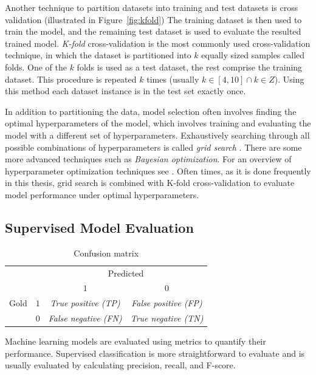 Another technique to partition datasets into training and test datasets
is cross validation \citep{arlot2010survey} (illustrated in Figure~\ref{fig:kfold})
The training dataset is then used to train the model, and the remaining
test dataset is used to evaluate the resulted trained model. 
\textit{K-fold} cross-validation is the most commonly used
cross-validation technique, in which the dataset is partitioned into 
$k$ equally sized samples called folds. One of the $k$ folds is
used as a test dataset, the rest comprise the training dataset. This
procedure is repeated $k$ times (usually $k \in [4, 10] \cap k \in Z$).
Using this method each dataset instance is in the test set 
exactly once.

In addition to partitioning the data, model selection often involves finding
the optimal hyperparameters of the model, which involves  training and
evaluating the model with a different set of hyperparameters.  Exhaustively
searching through all possible combinations of hyperparameters is called
\textit{grid search} \citep{bergstra2012random}. There are some more advanced
techniques such as \textit{Bayesian optimization}.  For an overview of
hyperparameter optimization techniques see \citep{snoek2012practical}.
Often times, as it is done frequently in this thesis, grid search is combined 
with K-fold cross-validation to evaluate model performance under optimal
hyperparameters. 

\subsection{Supervised Model Evaluation}
\label{sec:metrics}

\begin{table}[t]
	\centering
	\begin{tabular}{c c|c c}
	\toprule
	& & \multicolumn{2}{c}{Predicted} \\
	\multirow{4}{*}{Gold} & & $1$ & $0$ \\ \hline
	& $1$ & \textit{True positive (TP)} & \textit{False positive (FP)} \\
		& $0$ & \textit{False negative (FN)} & \textit{True negative (TN)} \\
	\bottomrule
\end{tabular}
	\caption{Confusion matrix}
	\label{tab:conf_mat}
\end{table}

Machine learning models are evaluated using metrics to quantify their
performance. Supervised classification is more straightforward to evaluate and
is usually evaluated by calculating precision, recall, and F-score. 

